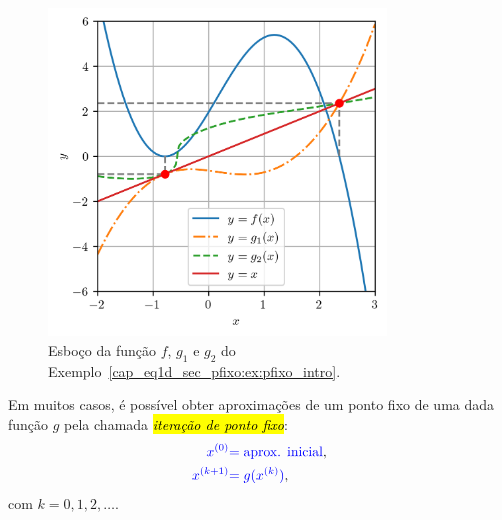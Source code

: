 \begin{ex}
\begin{figure}[H]
  \centering
  \includegraphics[width=0.8\textwidth]{./cap_eq1d/dados/fig_ex_pfixo_intro/fig}
  \caption{Esboço da função $f$, $g_1$ e $g_2$ do Exemplo~\ref{cap_eq1d_sec_pfixo:ex:pfixo_intro}.}
  \label{cap_eq1d_sec_pfixo:fig:ex_pfixo_intro}
\end{figure}
\end{ex}

Em muitos casos, é possível obter aproximações de um ponto fixo de uma dada função $g$ pela chamada \hl{\emph{iteração de ponto fixo}}:
\begin{align}
  {\color{blue}x^{(0)}} &{\color{blue}= \text{aprox. inicial}},\\
  {\color{blue}x^{(k+1)}} &{\color{blue}= g(x^{(k)})},
\end{align}
com $k=0, 1, 2, \ldots$.

